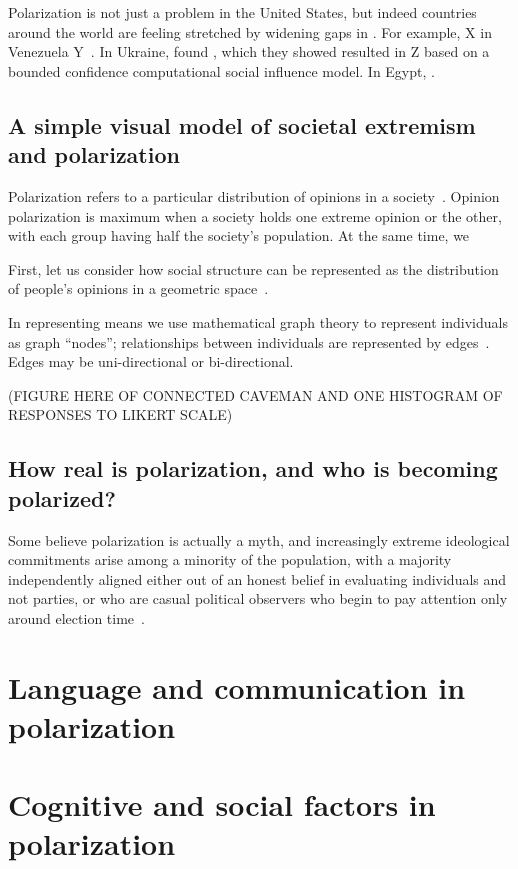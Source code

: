 \documentclass[12pt,letterpaper]{article}
\begin{document}
Polarization is not just a problem in the United States, but indeed countries
around the world are feeling stretched by widening gaps in . For example,
X in Venezuela Y~\cite{Morales2015}. In Ukraine,  found , 
which they showed resulted
in Z based on a bounded confidence computational social influence model. 
In Egypt, \cite{Borge-Holthoefer2014}.


\subsection{A simple visual model of societal extremism and polarization}

Polarization refers to a particular distribution of opinions in a 
society~\cite{Blau1974,Bramson2016,Turner2018}. Opinion polarization is maximum when
a society holds one extreme opinion or the other, with each group having half
the society's population. At the same time, we 

First, let us consider how social structure can be represented as
the distribution of people's opinions in a geometric space~\cite{Blau1974}.

In representing  means we use mathematical graph theory to represent 
individuals as graph ``nodes''; relationships between individuals
are represented by edges~\cite{Friedkin1998,Barabasi2016}. 
Edges may be uni-directional or bi-directional.


(FIGURE HERE OF CONNECTED CAVEMAN AND ONE HISTOGRAM OF RESPONSES TO LIKERT SCALE)

\subsection{How real is polarization, and who is becoming polarized?}

Some believe polarization is actually a myth, and increasingly 
extreme ideological commitments arise among a minority of the population,
with a majority independently aligned either out of an honest belief in 
evaluating individuals and not parties, or who are casual political
observers who begin to pay attention only around election time~\cite{Kinder2017}.

\section{Language and communication in polarization}



\section{Cognitive and social factors in polarization}
\end{document}
